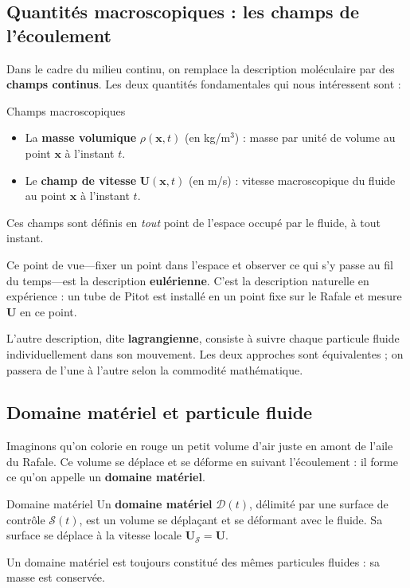 \documentclass[11pt,a4paper]{report}
\begin{document}
\subsection{Quantités macroscopiques : les champs de l'écoulement}

Dans le cadre du milieu continu, on remplace la description moléculaire par des
\textbf{champs continus}. Les deux quantités fondamentales qui nous intéressent sont :

\begin{defbox}{Champs macroscopiques}
\begin{itemize}
    \item La \textbf{masse volumique} $\rho(\bm{x},t)$ (en kg/m$^3$) : masse par unité
    de volume au point $\bm{x}$ à l'instant $t$.
    \item Le \textbf{champ de vitesse} $\bm{U}(\bm{x},t)$ (en m/s) : vitesse
    macroscopique du fluide au point $\bm{x}$ à l'instant $t$.
\end{itemize}
Ces champs sont définis en \textit{tout} point de l'espace occupé par le fluide, à
tout instant.
\end{defbox}

Ce point de vue---fixer un point dans l'espace et observer ce qui s'y passe au fil
du temps---est la description \textbf{eulérienne}. C'est la description naturelle en
expérience : un tube de Pitot est installé en un point fixe sur le Rafale et mesure
$\bm{U}$ en ce point.

L'autre description, dite \textbf{lagrangienne}, consiste à suivre chaque particule
fluide individuellement dans son mouvement. Les deux approches sont équivalentes ; on
passera de l'une à l'autre selon la commodité mathématique.

\subsection{Domaine matériel et particule fluide}

Imaginons qu'on colorie en rouge un petit volume d'air juste en amont de l'aile du
Rafale. Ce volume se déplace et se déforme en suivant l'écoulement : il forme ce
qu'on appelle un \textbf{domaine matériel}.

\begin{defbox}{Domaine matériel}
Un \textbf{domaine matériel} $\mathcal{D}(t)$, délimité par une surface de contrôle
$\mathcal{S}(t)$, est un volume se déplaçant et se déformant avec le fluide. Sa
surface se déplace à la vitesse locale $\bm{U}_\mathcal{S} = \bm{U}$.

Un domaine matériel est toujours constitué des mêmes particules fluides : sa masse
est conservée.
\end{defbox}
\end{document}
